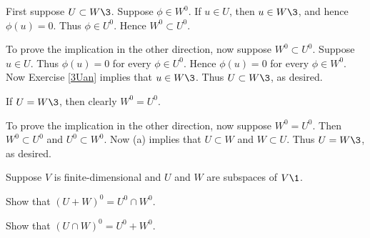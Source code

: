 \begin{Solution}
\begin{subtheorem}
\item
First suppose $U \subset W\3$. Suppose $\phi \in W^0\!$. If $u \in U$, then $u \in W\3$, and hence $\phi(u) = 0$. Thus $\phi \in U^0\!$. Hence $W^0 \subset U^0\!$.

To prove the implication in the other direction, now suppose $W^0 \subset U^0\!$. Suppose $u \in U$. Thus $\phi(u) = 0$ for every $\phi \in U^0\!$. Hence $\phi(u) = 0$ for every $\phi \in W^0\!$. Now Exercise \ref{3Uan} implies that $u \in W\3$. Thus $U \subset W\3$, as desired.

\item
If $U = W\3$, then clearly $W^0 = U^0\!$.

To prove the implication in the other direction, now suppose $W^0 = U^0\!$. Then $W^0 \subset U^0$ and $U^0 \subset W^0\!$. Now (a) implies that $U \subset W$ and $W \subset U$. Thus $U = W\3$, as desired.
\end{subtheorem}
\end{Solution}

\exercise
Suppose $V$ is finite-dimensional and $U$ and $W$ are subspaces of $V\1$.\label{2222}
\begin{subtheorem}
\item
Show that $(U + W)^0 = U^0 \cap W^0\!$.
\item
Show that $(U \cap W)^0 = U^0 + W^0\!$.
\end{subtheorem}
\exercisesubtheoremend


